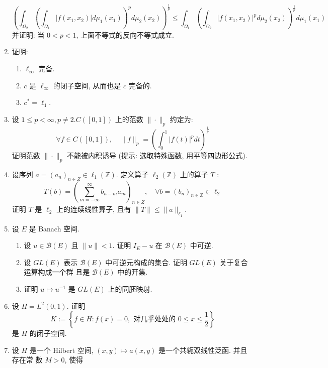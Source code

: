 \begin{enumerate}
        \[
        \left(\int_{\Omega_{2}}\left(\int_{\Omega_{1}}\left|f\left(x_{1}, x_{2}\right)\right| d \mu_{1}\left(x_{1}\right)\right)^{p} d \mu_{2}\left(x_{2}\right)\right)^{\frac{1}{p}} \leq \int_{\Omega_{1}}\left(\int_{\Omega_{2}}\left|f\left(x_{1}, x_{2}\right)\right|^{p} d \mu_{2}\left(x_{2}\right)\right)^{\frac{1}{p}} d \mu_{1}\left(x_{1}\right)
        \]
        并证明: 当 $0<p<1$, 上面不等式的反向不等式成立.
        \item 证明: 
            \begin{enumerate}
                \item $\ell_{\infty}$ 完备.
                \item $c$ 是 $\ell_{\infty}$ 的闭子空间, 从而也是 $c$ 完备的.
                \item $c^{*}=\ell_{1}$.
            \end{enumerate}
        \item 设 $1 \leq p<\infty, p \neq  2 . C([0,1])$ 上的范数 $\|\cdot\|_{p}$ 约定为:
        $$
        \forall f \in C([0,1]), \quad\|f\|_{p}=\left(\int_{0}^{1}|f(t)|^{p} d t\right)^{\frac{1}{p}}
        $$
        证明范数 $\|\cdot\|_{p}$ 不能被内积诱导 (提示: 选取特殊函数, 用平等四边形公式).
        \item 设序列 $a=\left(a_{n}\right)_{n \in Z} \in \ell_{1}(\mathbb{Z})$. 定义算子 $\ell_{2}(\mathbb{Z})$ 上的算子 $T$ :
        \[
        T(b)=\left(\sum_{m=-\infty}^{\infty} b_{n-m} a_{m}\right)_{n \in Z}, \quad \forall b=\left(b_{n}\right)_{n \in \mathbb{Z}} \in \ell_{2}
        \]
        证明 $T$ 是 $\ell_{2}$ 上的连续线性算子, 且有 $\|T\| \leq\|a\|_{\ell_{1}}$.
        \item 设 $E$ 是 Banach 空间.
            \begin{enumerate}
                \item 设 $u \in \mathcal{B}(E)$ 且 $\|u\|<1$. 证明 $I_{E}-u$ 在 $\mathcal{B}(E)$ 中可逆.
                \item 设 $G L(E)$ 表示 $\mathcal{B}(E)$ 中可逆元构成的集合. 证明 $G L(E)$ 关于复合运算构成一个群 且是 $\mathcal{B}(E)$ 中的开集.
                \item 证明 $u \mapsto u^{-1}$ 是 $G L(E)$ 上的同胚映射.
            \end{enumerate}
        \item 设 $H=L^{2}(0,1)$. 证明
        \[
        K:=\left\{f \in H: f(x)=0, \text { 对几乎处处的 } 0 \leq x \leq \frac{1}{2}\right\}
        \]
        是 $H$ 的闭子空间.
        \item 设 $H$ 是一个 Hilbert 空间, $(x, y) \mapsto a(x, y)$ 是一个共轭双线性泛函. 并且存在常 数 $M>0$, 使得

\end{enumerate}
